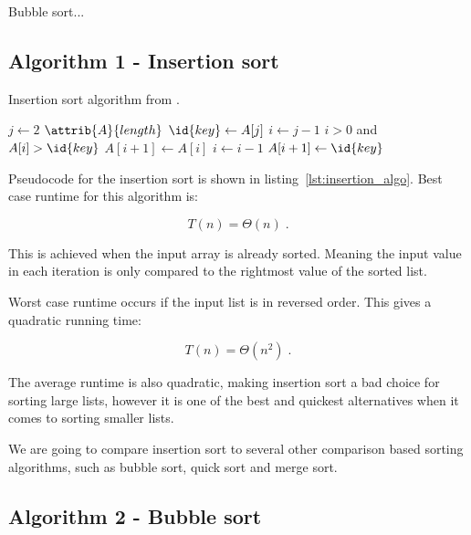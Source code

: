 \documentclass[sigconf, nonacm, natbib, screen, balance=False]{acmart}
\begin{document}
Bubble sort...

\subsection{Algorithm 1 - Insertion sort}\label{sec:algo1}

\begin{listing}
  \caption{Insertion sort algorithm from \citet[Ch.~2.1]{CLRS_2009}.}
  \label{lst:insertion_algo}

  \begin{codebox}
    \li \For $j \gets 2$ \To $\attrib{A}{length}$
    \li \Do
    $\id{key} \gets A[j]$
    \li     $i \gets j-1$
    \li      \While $i>0$ and $A[i] > \id{key}$
    \li      \Do
    $A[i+1] \gets A[i]$
    \li         $i \gets i-1$
    \End    
    \li       $A[i+1]\gets \id{key}$
    \End
  \end{codebox}
\end{listing}

Pseudocode for the insertion sort is shown in
listing~\ref{lst:insertion_algo}. 
Best case runtime for this algorithm is:

\begin{equation}
  T(n) = \Theta(n) \;.  \label{eq:ins_sort_best}
\end{equation}

This is achieved when the input array is already sorted. Meaning the input value in each iteration is only compared to the rightmost value of the sorted list. 

Worst case runtime occurs if the input list is in reversed order. This gives a quadratic running time:

\begin{equation}
  T(n) = \Theta(n^2) \;.  \label{eq:ins_sort_best}
\end{equation}

The average runtime is also quadratic, making insertion sort a bad choice for sorting large lists, however it is one of the best and quickest alternatives when it comes to sorting smaller lists. 

We are going to compare insertion sort to several other comparison based sorting algorithms, such as bubble sort, quick sort and merge sort.

\subsection{Algorithm 2 - Bubble sort}\label{sec:algo2}
\end{document}
